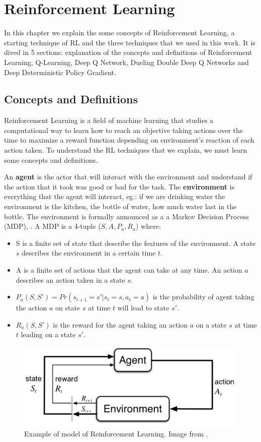\chapter{Reinforcement Learning}\label{chapter:architecture}
In this chapter we explain the some concepts of Reinforcement Learning, a starting technique of RL and the three techniques that we used in this work. It is dived in 5 sections: explanation of the concepts and definitions of Reinforcement Learning, Q-Learning, Deep Q Network, Dueling Double Deep Q Networks and Deep Deterministic Policy Gradient.

\section{Concepts and Definitions}
Reinforcement Learning is a field of machine learning that studies a computational way to learn how to reach an objective taking actions over the time to maximize a reward function depending on environment's reaction of each action taken. To understand the RL techniques that we explain, we must learn some concepts and definitions. 

An \textbf{agent} is the actor that will interact with the environment and understand if the action that it took was good or bad for the task. The \textbf{environment} is everything that the agent will interact, eg.: if we are drinking water the environment is the kitchen, the  bottle of water, how much water last in the bottle. The environment is formally announced as a a Markov Decision Process (MDP), \cite{mdp}. A MDP is a 4-tuple ($S, A, P_a, R_a$) where:
\begin{itemize}
    \item S is a finite set of state that describe the features of the environment. A state $s$ describes the environment in a certain time $t$.
    \item A is a finite set of actions that the agent can take at any time. An action $a$ describes an action taken in a state $s$.
    \item $P_a(S,S') = Pr(s_{t+1}=s' | s_t=s, a_t=a)$ is the probability of agent taking the action $a$ on state $s$ at time $t$ will lead to state $s'$.
    \item $R_a(S,S')$ is the reward for the agent taking an action $a$ on a state $s$ at time $t$ leading on a state $s'$.
\end{itemize}

\begin{figure}[H]
    \centering
    \includegraphics[scale=0.5]{images/rl.png}
    \caption{Example of model of Reinforcement Learning. Image from \cite{rlsutton}.}
    \label{fig:my_label}
\end{figure}

